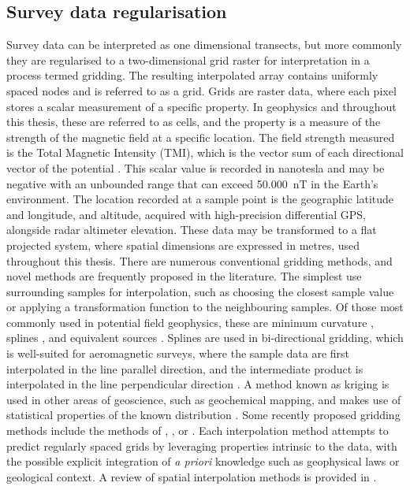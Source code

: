 \documentclass[manuscript.tex]{subfiles}
\begin{document}
\subsection{Survey data regularisation}
\label{sec:introgrids}
Survey data can be interpreted as one dimensional transects, but more commonly they are regularised to a two-dimensional grid raster for interpretation in a process termed gridding.
The resulting interpolated array contains uniformly spaced nodes and is referred to as a grid.
Grids are raster data, where each pixel stores a scalar measurement of a specific property.
In geophysics and throughout this thesis, these are referred to as cells, and the property is a measure of the strength of the magnetic field at a specific location.
The field strength measured is the Total Magnetic Intensity (TMI), which is the vector sum of each directional vector of the potential \parencite{blakelyPotentialTheoryGravity1996}.
This scalar value is recorded in nanotesla and may be negative with an unbounded range that can exceed \qty{50,000}{\nano\tesla} in the Earth's environment.
The location recorded at a sample point is the geographic latitude and longitude, and altitude, acquired with high-precision differential GPS, alongside radar altimeter elevation.
These data may be transformed to a flat projected system, where spatial dimensions are expressed in metres, used throughout this thesis.
There are numerous conventional gridding methods, and novel methods are frequently proposed in the literature.
The simplest use surrounding samples for interpolation, such as choosing the closest sample value or applying a transformation function to the neighbouring samples.
Of those most commonly used in potential field geophysics, these are minimum curvature \parencite{briggsMachineContouringUsing1974}, splines \parencite{bhattacharyyaBicubicSplineInterpolation1969,shureHarmonicSplinesGeomagnetic1982,smithGriddingContinuousCurvature1990}, and equivalent sources \parencite{dampneyEquivalentSourceTechnique1969, solerBetterStrategyInterpolating2020}.
Splines are used in bi-directional gridding, which is well-suited for aeromagnetic surveys, where the sample data are first interpolated in the line parallel direction, and the intermediate product is interpolated in the line perpendicular direction \parencite{dentithGeophysicsMineralExploration2014}.
A method known as kriging is used in other areas of geoscience, such as geochemical mapping, and makes use of statistical properties of the known distribution \parencite{hansenInterpretiveGriddingAnisotropic1993,davis1986statistics}.
Some recently proposed gridding methods include the methods of \textcite{naprstekNewMethodInterpolating2019}, \textcite{xuGravityAnomalyReconstruction2019}, or \textcite{chenPotentialFieldData2022}.
Each interpolation method attempts to predict regularly spaced grids by leveraging properties intrinsic to the data, with the possible explicit integration of \emph{a priori} knowledge such as geophysical laws or geological context.
A review of spatial interpolation methods is provided in \textcite{liReviewComparativeStudies2011}.
\end{document}
